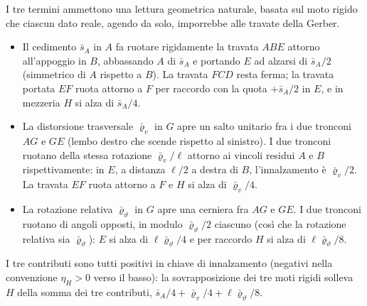 \begin{esempio}
\begin{svolgimento}
		I tre termini ammettono una lettura geometrica naturale, 
		basata sul moto rigido che ciascun dato reale, agendo da solo, 
		imporrebbe alle travate della Gerber.
		\begin{itemize}[noitemsep,topsep=2pt]
			\item Il cedimento $\bar s_A$ in $A$ fa ruotare rigidamente 
			la travata $ABE$ attorno all'appoggio in $B$, abbassando $A$ 
			di $\bar s_A$ e portando $E$ ad alzarsi di $\bar s_A/2$ 
			(simmetrico di $A$ rispetto a $B$). La travata $FCD$ resta 
			ferma; la travata portata $EF$ ruota attorno a $F$ per 
			raccordo con la quota $+\bar s_A/2$ in $E$, e in mezzeria 
			$H$ si alza di $\bar s_A/4$.
			\item La distorsione trasversale $\bar\varrho_v$ in $G$ 
			apre un salto unitario fra i due tronconi $AG$ e $GE$ 
			(lembo destro che scende rispetto al sinistro). I due 
			tronconi ruotano della stessa rotazione $\bar\varrho_v/\ell$ 
			attorno ai vincoli residui $A$ e $B$ rispettivamente: in $E$, 
			a distanza $\ell/2$ a destra di $B$, l'innalzamento è 
			$\bar\varrho_v/2$. La travata $EF$ ruota attorno a $F$ e 
			$H$ si alza di $\bar\varrho_v/4$.
			\item La rotazione relativa $\bar\varrho_\vartheta$ in $G$ 
			apre una cerniera fra $AG$ e $GE$. I due tronconi ruotano 
			di angoli opposti, in modulo $\bar\varrho_\vartheta/2$ 
			ciascuno (così che la rotazione relativa sia 
			$\bar\varrho_\vartheta$): $E$ si alza di $\ell\bar\varrho_\vartheta/4$ 
			e per raccordo $H$ si alza di $\ell\bar\varrho_\vartheta/8$.
		\end{itemize}
		I tre contributi sono tutti positivi in chiave di innalzamento 
		(negativi nella convenzione $\eta_H>0$ verso il basso): la 
		sovrapposizione dei tre moti rigidi solleva $H$ della somma dei 
		tre contributi, $\bar s_A/4 + \bar\varrho_v/4 + \ell\bar\varrho_\vartheta/8$.
		
	\end{svolgimento}
\end{esempio}




